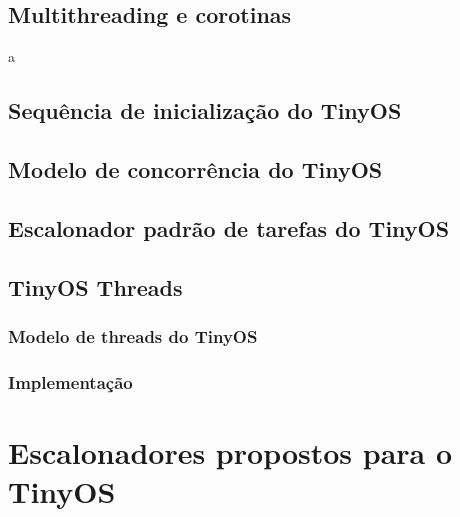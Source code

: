 \documentclass[a4paper, 10pt]{article}
\begin{document}
\subsection{Multithreading e corotinas}
a

\subsection {Sequência de inicialização do TinyOS}


\subsection{Modelo de concorrência do TinyOS}


\subsection{Escalonador padrão de tarefas do TinyOS}\label{escalonadorpadrao}


\subsection{TinyOS Threads} \label{TOSThreads}
\subsubsection{Modelo de threads do TinyOS}


\subsubsection{Implementação}


\section{Escalonadores propostos para o TinyOS}\label{escalonadorespropostos}

\end{document}
